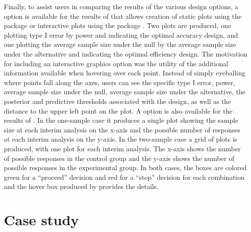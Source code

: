 Finally, to assist users in comparing the results of the various design
options, a  option is available for the results of
 that allows creation of static plots using
the  package \citep{Wickham2016} or interactive plots
using the  package \citep{Sievert2020}. Two plots are
produced, one plotting type I error by power and indicating the optimal
accuracy design, and one plotting the average sample size under the null
by the average sample size under the alternative and indicating the
optimal efficiency design. The motivation for including an interactive
graphics option was the utility of the additional information available
when hovering over each point. Instead of simply eyeballing where points
fall along the axes, users can see the specific type I error, power,
average sample size under the null, average sample size under the
alternative, the posterior and predictive thresholds associated with the
design, as well as the distance to the upper left point on the plot. A
 option is also available for the results of
. In the one-sample case it produces a
single plot showing the sample size at each interim analysis on the
x-axis and the possible number of responses at each interim analysis on
the y-axis. In the two-sample case a grid of plots is produced, with one
plot for each interim analysis. The x-axis shows the number of possible
responses in the control group and the y-axis shows the number of
possible responses in the experimental group. In both cases, the boxes
are colored green for a ``proceed'' decision and red for a ``stop''
decision for each combination and the hover box produced by
 provides the details.

\hypertarget{case-study}{%
\section{Case study}\label{case-study}}

